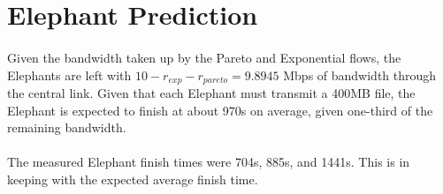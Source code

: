 \documentclass{article}
\begin{document}
\section{Elephant Prediction}

\paragraph{}
Given the bandwidth taken up by the Pareto and Exponential flows, the Elephants are left with $10 - r_{exp} - r_{pareto} = 9.8945$ Mbps of bandwidth through the central link.
Given that each Elephant must transmit a 400MB file, the Elephant is expected to finish at about 970s on average, given one-third of the remaining bandwidth.

\paragraph{}
The measured Elephant finish times were 704s, 885s, and 1441s. This is in keeping with the expected average finish time.
\end{document}
